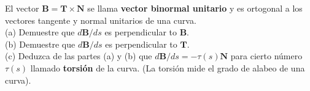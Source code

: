 \item El vector $\mathbf{B} = \mathbf{T} \times \mathbf{N}$ se llama \textbf{vector binormal unitario} y es ortogonal a los vectores tangente y normal unitarios de una curva. \\
    (a) Demuestre que $d\mathbf{B}/ds$ es perpendicular to $\mathbf{B}$. \\
    (b) Demuestre que $d\mathbf{B}/ds$ es perpendicular to $\mathbf{T}$. \\
    (c) Deduzca de las partes (a) y (b) que $d\mathbf{B}/ds = -\tau(s)\mathbf{N}$ para cierto número $\tau(s)$ llamado \textbf{torsión} de la curva. (La torsión mide el grado de alabeo de una curva).
